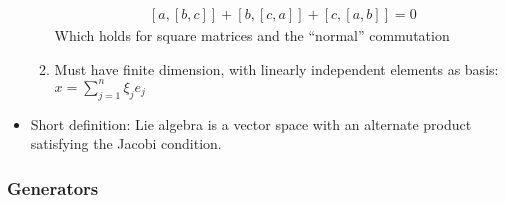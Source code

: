 \begin{itemize}
\begin{enumerate}
\begin{equation}
\begin{split}
        [a,[b,c]]+[b,[c,a]]+[c,[a,b]]=0
        \end{split}\end{equation}
        Which holds for square matrices and the ``normal'' commutation
        \item Must have finite dimension, with linearly independent elements as basis: $x=\sum_{j=1}^n\xi_je_j$ \cite{pfeifer}
    \end{enumerate}
    \item Short definition: Lie algebra is a vector space with an alternate product satisfying the Jacobi condition. \cite{pfeifer}
\end{itemize}

\subsubsection{Generators}
